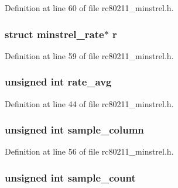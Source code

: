 Definition at line 60 of file rc80211\-\_\-minstrel.\-h.

\hypertarget{structminstrel__sta__info_aff05543e291b9d013012d0a94c3d4428}{
\subsubsection[{r}]{\setlength{\rightskip}{0pt plus 5cm}struct {\bf minstrel\-\_\-rate}$\ast$ r}}\label{structminstrel__sta__info_aff05543e291b9d013012d0a94c3d4428}


Definition at line 59 of file rc80211\-\_\-minstrel.\-h.

\hypertarget{structminstrel__sta__info_a28afea3f4f42a76c7ea48b9ac0399b76}{
\subsubsection[{rate\-\_\-avg}]{\setlength{\rightskip}{0pt plus 5cm}unsigned int rate\-\_\-avg}}\label{structminstrel__sta__info_a28afea3f4f42a76c7ea48b9ac0399b76}


Definition at line 44 of file rc80211\-\_\-minstrel.\-h.

\hypertarget{structminstrel__sta__info_a9096126b3357b30a3a2c97059127c15b}{
\subsubsection[{sample\-\_\-column}]{\setlength{\rightskip}{0pt plus 5cm}unsigned int sample\-\_\-column}}\label{structminstrel__sta__info_a9096126b3357b30a3a2c97059127c15b}


Definition at line 56 of file rc80211\-\_\-minstrel.\-h.

\hypertarget{structminstrel__sta__info_a9c671b28b78e58cee0581915eadec995}{
\subsubsection[{sample\-\_\-count}]{\setlength{\rightskip}{0pt plus 5cm}unsigned int sample\-\_\-count}}\label{structminstrel__sta__info_a9c671b28b78e58cee0581915eadec995}


